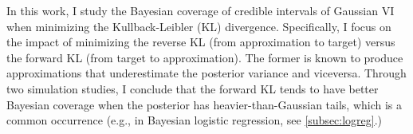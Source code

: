 In this work, I study the Bayesian coverage of
credible intervals of Gaussian VI when minimizing
the Kullback-Leibler (KL) divergence.
Specifically, I focus on the impact of minimizing the reverse KL
(from approximation to target) versus the forward KL (from target to approximation).
The former is known to produce approximations that underestimate
the posterior variance and viceversa.
Through two simulation studies,
I conclude that the forward KL tends to have better Bayesian coverage
when the posterior has heavier-than-Gaussian tails,
which is a common occurrence
(e.g., in Bayesian logistic regression, see \cref{subsec:logreg}.)
